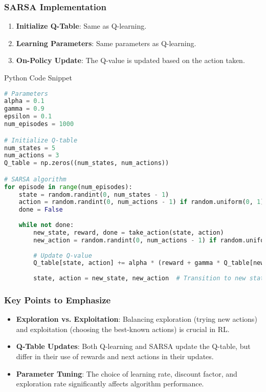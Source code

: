 \documentclass[aspectratio=169]{beamer}
\begin{document}
\begin{frame}[fragile]
    \frametitle{SARSA Implementation}
    \begin{enumerate}
        \item \textbf{Initialize Q-Table}: Same as Q-learning.
        \item \textbf{Learning Parameters}: Same parameters as Q-learning.
        \item \textbf{On-Policy Update}: The Q-value is updated based on the action taken.
    \end{enumerate}
    \begin{block}{Python Code Snippet}
        \begin{lstlisting}[language=Python]
# Parameters
alpha = 0.1
gamma = 0.9
epsilon = 0.1
num_episodes = 1000

# Initialize Q-table
num_states = 5
num_actions = 3
Q_table = np.zeros((num_states, num_actions))

# SARSA algorithm
for episode in range(num_episodes):
    state = random.randint(0, num_states - 1)
    action = random.randint(0, num_actions - 1) if random.uniform(0, 1) < epsilon else np.argmax(Q_table[state])
    done = False
    
    while not done:
        new_state, reward, done = take_action(state, action)
        new_action = random.randint(0, num_actions - 1) if random.uniform(0, 1) < epsilon else np.argmax(Q_table[new_state])
        
        # Update Q-value
        Q_table[state, action] += alpha * (reward + gamma * Q_table[new_state, new_action] - Q_table[state, action])
        
        state, action = new_state, new_action  # Transition to new state and action
        \end{lstlisting}
    \end{block}
\end{frame}

\begin{frame}
    \frametitle{Key Points to Emphasize}
    \begin{itemize}
        \item \textbf{Exploration vs. Exploitation}: Balancing exploration (trying new actions) and exploitation (choosing the best-known actions) is crucial in RL.
        \item \textbf{Q-Table Updates}: Both Q-learning and SARSA update the Q-table, but differ in their use of rewards and next actions in their updates.
        \item \textbf{Parameter Tuning}: The choice of learning rate, discount factor, and exploration rate significantly affects algorithm performance.
    \end{itemize}
\end{frame}
\end{document}
